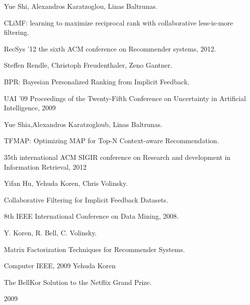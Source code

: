 \documentclass[a4paper,12pt]{article}
\begin{document}
	\begin{thebibliography}{00} %
    	
    	Yue Shi, Alexandros Karatzoglou, Linas Baltrunas.
    	
CLiMF: learning to maximize reciprocal rank with collaborative less-is-more filtering. 	
    	
    RecSys '12 the sixth ACM conference on Recommender systems, 2012.    	
    	
         
	     Steffen Rendle, Christoph Freudenthaler, Zeno Gantner.    
         
         BPR: Bayesian Personalized Ranking from Implicit Feedback.
         
         UAI '09 Proceedings of the Twenty-Fifth Conference on Uncertainty in Artificial Intelligence, 2009
         
		
		Yue Shia,Alexandros Karatzogloub, Linas Baltrunas.
		
TFMAP: Optimizing MAP for Top-N Context-aware Recommendation.		
		
		35th international ACM SIGIR conference on Research and development in Information Retrieval, 2012
		
	Yifan Hu, Yehuda Koren, Chris Volinsky.
	
	Collaborative Filtering for Implicit Feedback Datasets.
	
	8th IEEE International Conference on Data Mining, 2008.
	
	
	Y. Koren, R. Bell, C. Volinsky.	
	
	Matrix Factorization Techniques for Recommender Systems.
	
	Computer IEEE, 2009
	Yehuda Koren
	
	The BellKor Solution to the Netflix Grand Prize. 
	
	2009


\end{thebibliography}
\end{document}
